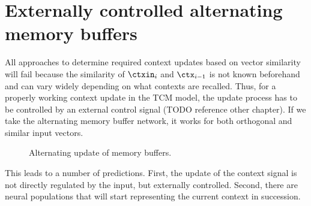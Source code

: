 \section{Externally controlled alternating memory buffers}
All approaches to determine required context updates based on vector similarity will fail because the similarity of $\ctxin_i$ and $\ctx_{i-1}$ is not known beforehand and can vary widely depending on what contexts are recalled.
Thus, for a properly working context update in the TCM model, the update process has to be controlled by an external control signal (TODO reference other chapter).
If we take the alternating memory buffer network, it works for both orthogonal and similar input vectors.
\begin{figure}
    \centering
    \caption{Alternating update of memory buffers.}\label{fig:ctx-bounded-integrator}
\end{figure}

This leads to a number of predictions.
First, the update of the context signal is not directly regulated by the input, but externally controlled.
Second, there are neural populations that will start representing the current context in succession.
